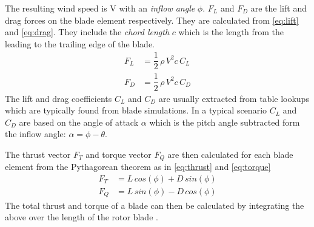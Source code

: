 The resulting wind speed is V with an \textit{inflow angle} $ \phi $. $ F_L $ and $ F_D $ are the lift and drag forces on the blade element respectively. They are calculated from \cref{eq:lift} and \cref{eq:drag}. They include the \textit{chord length} $ c $ which is the length from the leading to the trailing edge of the blade.
\begin{align}
	F_L &= \dfrac{1}{2}\,  \rho \, V^2 c \, C_L \label{eq:lift}\\
	F_D &= \dfrac{1}{2} \, \rho \, V^2 c \, C_D \label{eq:drag}
\end{align}
The lift and drag coefficients $ C_L $ and $ C_D $ are usually extracted from table lookups which are typically found from blade simulations. In a typical scenario $ C_L $ and $ C_D $ are based on the angle of attack $ \alpha $ which is the pitch angle subtracted form the inflow angle: $ \alpha = \phi - \theta $.

The thrust vector $ F_T $ and torque vector $ F_Q $ are then calculated for each blade element from the Pythagorean theorem as in \cref{eq:thrust} and \cref{eq:torque}
\begin{align}
	F_T &= L \, cos(\phi) + D \, sin(\phi) \label{eq:thrust} \\
	F_Q &= L \, sin(\phi) - D \, cos(\phi) \label{eq:torque}
\end{align}
The total thrust and torque of a blade can then be calculated by integrating the above over the length of the rotor blade \cite{Knudsen2013}.


